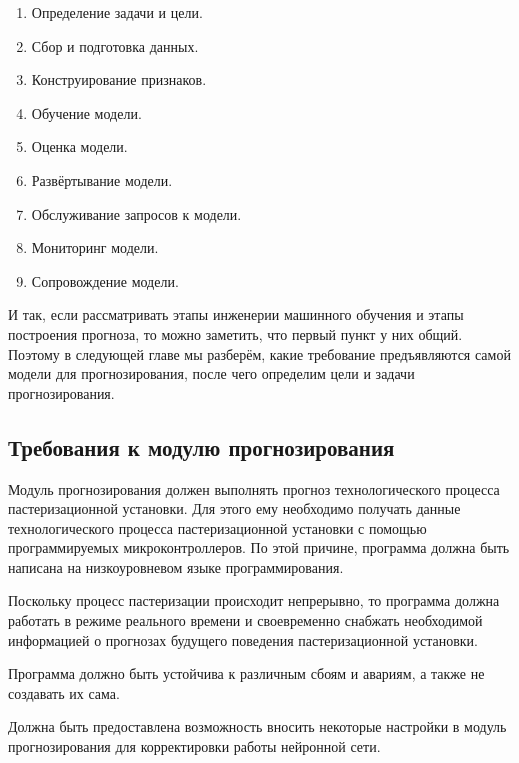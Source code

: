 {  \begin{enumerate} 
    \item Определение задачи и цели. 
    \item Сбор и подготовка данных. 
    \item Конструирование признаков.
    \item Обучение модели.
    \item Оценка модели.
    \item Развёртывание модели.
    \item Обслуживание запросов к модели.
    \item Мониторинг модели.
    \item Сопровождение модели. 
  \end{enumerate} 

  \par \redline И так, если рассматривать этапы инженерии машинного обучения и этапы построения прогноза, то можно заметить, что первый пункт у них общий. Поэтому в следующей главе мы разберём, какие требование предъявляются самой модели для прогнозирования, после чего определим цели и задачи прогнозирования.

  \par
}

\titlespace
\subsection{
  \cyrillicfont 
  \fontsize{14pt}{24pt}\selectfont
  \englishfont
  \redline
  Требования к модулю прогнозирования
} 
\titlespace

{\cyrillicfont 
\fontsize{13pt}{16.25pt}\selectfont 
\englishfont 

  \par \redline Модуль прогнозирования должен выполнять прогноз технологического процесса пастеризационной установки. Для этого ему необходимо получать данные технологического процесса пастеризационной установки с помощью программируемых микроконтроллеров. По этой причине, программа должна быть написана на низкоуровневом языке программирования. 

  \par \redline Поскольку процесс пастеризации происходит непрерывно, то программа должна работать в режиме реального времени и своевременно снабжать необходимой информацией о прогнозах будущего поведения пастеризационной установки. 

  \par \redline Программа должно быть устойчива к различным сбоям и авариям, а также не создавать их сама. 

  \par \redline Должна быть предоставлена возможность вносить некоторые настройки в модуль прогнозирования для корректировки работы нейронной сети. 

  \par 
}

